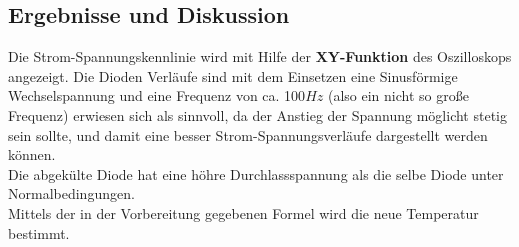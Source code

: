 \subsection{Ergebnisse und Diskussion}
Die Strom-Spannungskennlinie wird mit Hilfe der \textbf{XY-Funktion} des Oszilloskops angezeigt. Die Dioden Verl\"aufe sind mit dem Einsetzen eine Sinusf\"ormige Wechselspannung und eine Frequenz von ca. 100$Hz$ (also ein nicht so gro\ss e Frequenz) erwiesen sich als sinnvoll, da der Anstieg der Spannung m\"oglicht stetig sein sollte, und damit eine besser Strom-Spannungsverl\"aufe dargestellt werden k\"onnen.    \\
Die abgek\"ulte Diode hat eine h\"ohre Durchlassspannung als die selbe Diode unter Normalbedingungen. \\
Mittels der in der Vorbereitung gegebenen Formel wird die neue Temperatur bestimmt.

